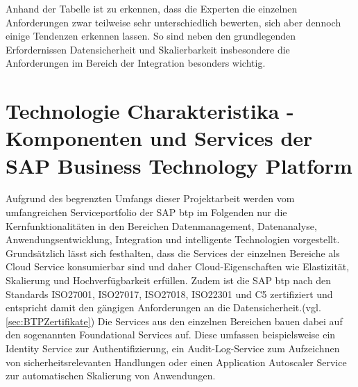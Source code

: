 Anhand der Tabelle ist zu erkennen, dass die Experten die einzelnen Anforderungen zwar teilweise sehr unterschiedlich bewerten, sich aber dennoch einige Tendenzen erkennen lassen. So sind neben den grundlegenden Erfordernissen Datensicherheit und Skalierbarkeit insbesondere die Anforderungen im Bereich der Integration besonders wichtig. 










\section{Technologie Charakteristika - Komponenten und Services der SAP Business Technology Platform}\label{sec:TechCharak}

Aufgrund des begrenzten Umfangs dieser Projektarbeit werden vom umfangreichen Serviceportfolio der SAP \ac{btp} im Folgenden nur die Kernfunktionalitäten in den Bereichen Datenmanagement, Datenanalyse, Anwendungsentwicklung, Integration und intelligente Technologien vorgestellt. Grundsätzlich lässt sich festhalten, dass die Services der einzelnen Bereiche als Cloud Service konsumierbar sind und daher Cloud-Eigenschaften wie Elastizität, Skalierung und Hochverfügbarkeit erfüllen. \autocite[Vgl.][S. 60]{SEUBERT} Zudem ist die SAP \ac{btp} nach den Standards ISO27001, ISO27017, ISO27018, ISO22301 und C5 zertifiziert und entspricht damit den gängigen Anforderungen an die Datensicherheit.(vgl. \ref{sec:BTPZertifikate}) Die Services aus den einzelnen Bereichen bauen dabei auf den sogenannten Foundational Services auf. Diese umfassen beispielsweise ein Identity Service zur Authentifizierung, ein Audit-Log-Service zum Aufzeichnen von sicherheitsrelevanten Handlungen oder einen Application Autoscaler Service zur automatischen Skalierung von Anwendungen. \autocite[Vgl.][S. 58]{SEUBERT}


